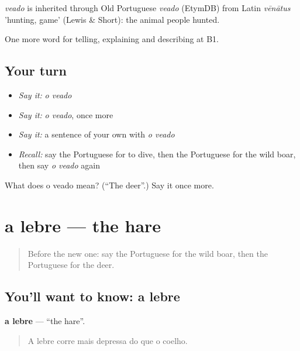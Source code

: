 \begin{cousinweb}
\emph{veado} is inherited through Old Portuguese \emph{veado} (EtymDB) from Latin \emph{vēnātus} 'hunting, game' (Lewis \& Short): the animal people hunted.
\end{cousinweb}

\begin{grammarlens}[title={What you've built}]
One more word for telling, explaining and describing at B1.
\end{grammarlens}

\subsection*{Your turn}
\begin{itemize}
\raggedright
  \item \emph{Say it:} \emph{o veado}
  \item \emph{Say it:} \emph{o veado}, once more
  \item \emph{Say it:} a sentence of your own with \emph{o veado}
  \item \emph{Recall:} say the Portuguese for to dive, then the Portuguese for the wild boar, then say \emph{o veado} again
\end{itemize}

\begin{tcolorbox}[breakable,colback=teal!4,colframe=teal!35!black,title={Before you move on}]
What does o veado mean? (\textquotedblleft{}The deer\textquotedblright{}.) Say it once more.
\end{tcolorbox}
\section[a lebre]{a lebre — the hare}

\label{lesson:PT-C460-lebre}



\begin{quote}
Before the new one: say the Portuguese for the wild boar, then the Portuguese for the deer.
\end{quote}

\subsection*{You'll want to know: a lebre}
\textbf{a lebre} — \textquotedblleft{}the hare\textquotedblright{}.

\begin{quote}
A lebre corre mais depressa do que o coelho.
\end{quote}

